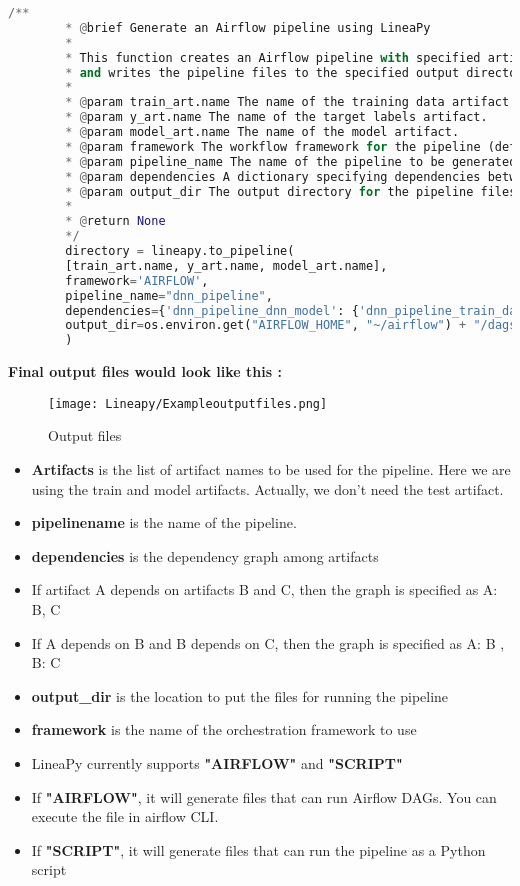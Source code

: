 	\begin{lstlisting}[language=Python]
		/**
		* @brief Generate an Airflow pipeline using LineaPy
		*
		* This function creates an Airflow pipeline with specified artifacts and dependencies, 
		* and writes the pipeline files to the specified output directory.
		*
		* @param train_art.name The name of the training data artifact.
		* @param y_art.name The name of the target labels artifact.
		* @param model_art.name The name of the model artifact.
		* @param framework The workflow framework for the pipeline (default: "AIRFLOW").
		* @param pipeline_name The name of the pipeline to be generated.
		* @param dependencies A dictionary specifying dependencies between pipeline tasks.
		* @param output_dir The output directory for the pipeline files. Defaults to "AIRFLOW_HOME/dags".
		*
		* @return None
		*/
		directory = lineapy.to_pipeline(
		[train_art.name, y_art.name, model_art.name], 
		framework='AIRFLOW',
		pipeline_name="dnn_pipeline",
		dependencies={'dnn_pipeline_dnn_model': {'dnn_pipeline_train_data', 'dnn_pipeline_y'}},
		output_dir=os.environ.get("AIRFLOW_HOME", "~/airflow") + "/dags"
		)
	\end{lstlisting}
	
\textbf{	Final output files would look like this :}
	
	\begin{figure}[h!]
		\centering
		\texttt{[image: Lineapy/Exampleoutputfiles.png]}
		\caption{Output files}
		\label{fig:Output files }
	\end{figure}
	
	
	\pagebreak
	\begin{itemize}
		\item \textbf{Artifacts} is the list of artifact names to be used for the pipeline. Here we are using the train and model artifacts. Actually, we don’t need the test artifact.
	\item \textbf{pipelinename} is the name of the pipeline. 
	\item \textbf{dependencies} is the dependency graph among artifacts
	\item If artifact A depends on artifacts B and C, then the graph is specified as { A: { B, C } }
	\item If A depends on B and B depends on C, then the graph is specified as { A: { B }, B: { C } }

	\item \textbf{output\_dir} is the location to put the files for running the pipeline
	\item \textbf{framework} is the name of the orchestration framework to use
	\item LineaPy currently supports \textbf{"AIRFLOW"} and \textbf{"SCRIPT"}
	\item If \textbf{"AIRFLOW"}, it will generate files that can run Airflow DAGs. You can execute the file in airflow CLI.
	\item If \textbf{"SCRIPT"}, it will generate files that can run the pipeline as a Python script
\end{itemize}
	
